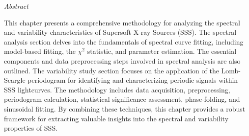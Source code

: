 \newpage
\begin{center}
	\emph{Abstract}
\end{center}
    
    This chapter presents a comprehensive methodology for analyzing the spectral and variability characteristics of Supersoft X-ray Sources (SSS). The spectral analysis section delves into the fundamentals of spectral curve fitting, including model-based fitting, the $\chi^2$ statistic, and parameter estimation. The essential components and data preprocessing steps involved in spectral analysis are also outlined. The variability study section focuses on the application of the Lomb-Scargle periodogram for identifying and characterizing periodic signals within SSS lightcurves. The methodology includes data acquisition, preprocessing, periodogram calculation, statistical significance assessment, phase-folding, and sinusoidal fitting. By combining these techniques, this chapter provides a robust framework for extracting valuable insights into the spectral and variability properties of SSS.